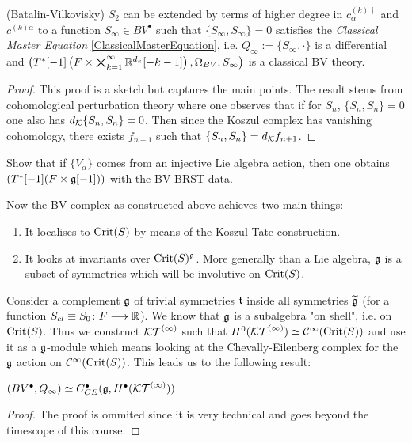 \begin{theo}(Batalin-Vilkovisky)
  $S_2$ can be extended by terms of higher degree in $c^{(k) \dagger}_\alpha$ and $c^{(k) \alpha}$ to a function $S_\infty \in BV^\bullet$ such that $\{S_\infty, S_\infty\} = 0$ satisfies the \emph{Classical Master Equation} \eqref{ClassicalMasterEquation}, i.e. $Q_\infty := \{S_\infty, \cdot \}$ is a differential and $\left(T^*[-1]\left(F \times \bigtimes_{k = 1}^\infty \mathbb{R}^{d_k}[-k-1]\right), \Omega_{BV}, S_\infty\right)$ is a classical BV theory.
\begin{proof}
  This proof is a sketch but captures the main points. The result stems from cohomological perturbation theory where one observes that if for $S_n$, $\{S_n, S_n\} = 0$ one also has $d_{{\mathcal{K}}} \{S_n, S_n\} = 0$. Then since the Koszul complex has vanishing cohomology, there exists $f_{n+1}$ such that $\{S_n, S_n\} = d_{{\mathcal{K}}} f_{n+1}$.
\end{proof}
\end{theo}

\begin{ex}
  Show that if $\{V_\alpha\}$ comes from an injective Lie algebra action, then one obtains $(T^*[-1](F \times \mathfrak{g}[-1]))$ with the BV-BRST data.
\end{ex}

Now the BV complex as constructed above achieves two main things:
\begin{enumerate}
  \item It localises to $\operatorname{Crit}(S)$ by means of the Koszul-Tate construction.
  \item It looks at invariants over $\operatorname{Crit}(S)^{\mathfrak{g}}$. More generally than a Lie algebra, $\mathfrak{g}$ is a subset of symmetries which will be involutive on $\operatorname{Crit}(S)$.
\end{enumerate}

Consider a complement $\mathfrak{g}$ of trivial symmetries $\mathfrak{t}$ inside all symmetries $\widetilde{\mathfrak{g}}$ (for a function $S_{cl} \equiv S_0 \colon F \longrightarrow \mathbb{R}$). We know that $\mathfrak{g}$ is a subalgebra "on shell", i.e. on $\operatorname{Crit}(S)$. Thus we construct ${\mathcal{KT}}^{(\infty)}$ such that $H^0({\mathcal{KT}}^{(\infty)}) \simeq \mathcal{C}^{\infty}(\operatorname{Crit}(S))$ and use it as a $\mathfrak{g}$-module which means looking at the Chevally-Eilenberg complex for the $\mathfrak{g}$ action on $\mathcal{C}^{\infty}(\operatorname{Crit}(S))$. This leads us to the following result:

\begin{theo}
  $(BV^\bullet, Q_\infty) \simeq C^\bullet_{CE}(\mathfrak{g}, H^\bullet({\mathcal{KT}}^{(\infty)}))$
\begin{proof}
  The proof is ommited since it is very technical and goes beyond the timescope of this course.
\end{proof}
\end{theo}

